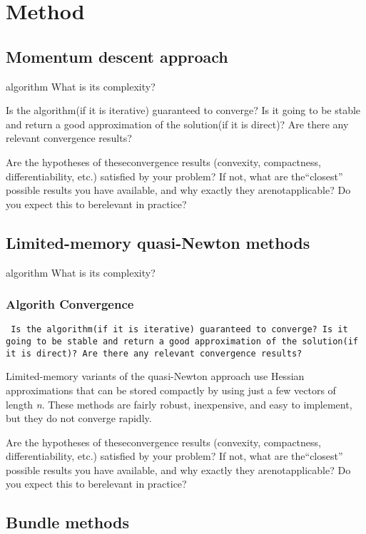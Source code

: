 \section{Method}

\subsection{Momentum descent approach}

 algorithm What is its complexity?

Is the algorithm(if it is iterative) guaranteed to converge? Is it going to be stable and return a good approximation of the solution(if it is direct)?  Are there any relevant convergence results?

Are the hypotheses of theseconvergence results (convexity, compactness, differentiability, etc.) satisfied by your problem? If not, what are the“closest” possible results you have available, and why exactly they arenotapplicable?  Do you expect this to berelevant in practice?

\subsection{Limited-memory quasi-Newton methods}



 algorithm What is its complexity?

\subsubsection{Algorith Convergence}
\texttt{ Is the algorithm(if it is iterative) guaranteed to converge? Is it going to be stable and return a good approximation of the solution(if it is direct)?  Are there any relevant convergence results?}

Limited-memory variants  of  the  quasi-Newton  approach use  Hessian  approximations  that  can  be stored compactly by using just a few vectors of length \textit{n}. These methods are fairly robust, inexpensive, and easy to implement, but they do not converge rapidly.

 
  Are the hypotheses of theseconvergence results (convexity, compactness, differentiability, etc.) satisfied by your problem? If not, what are the“closest” possible results you have available, and why exactly they arenotapplicable?  Do you expect this to berelevant in practice?

\subsection{Bundle methods}


